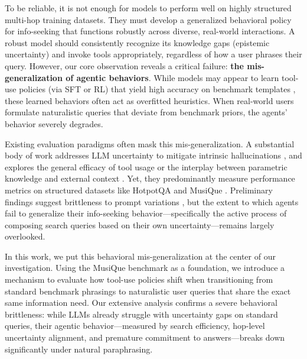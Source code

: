 \documentclass[10pt, letterpaper]{article}
\begin{document}
To be reliable, it is not enough for models to perform well on highly structured multi-hop training datasets. They must develop a generalized behavioral policy for info-seeking that functions robustly across diverse, real-world interactions. A robust model should consistently recognize its knowledge gaps (epistemic uncertainty) and invoke tools appropriately, regardless of how a user phrases their query. However, our core observation reveals a critical failure: \textbf{the mis-generalization of agentic behaviors}. While models may appear to learn tool-use policies (via SFT or RL) that yield high accuracy on benchmark templates \cite{chu_self-critique_2025}, these learned behaviors often act as overfitted heuristics. When real-world users formulate naturalistic queries that deviate from benchmark priors, the agents' behavior severely degrades.

Existing evaluation paradigms often mask this mis-generalization. A substantial body of work addresses LLM uncertainty to mitigate intrinsic hallucinations \cite{yona_can_2024, manakul_selfcheckgpt_2023, kuhn_semantic_2023, liu_metafaith_2025}, and explores the general efficacy of tool usage \cite{bai_qwen_2023, lu_toolsandbox_2025, keren_matter_2026, barres_2-bench_2025, ning_wtu-eval_2024} or the interplay between parametric knowledge and external context \cite{cheng_understanding_2024, yang_crag_2024, li_understanding_2024}. Yet, they predominantly measure performance metrics on structured datasets like HotpotQA \cite{yang_hotpotqa_2018} and MusiQue \cite{trivedi__2022}. Preliminary findings suggest brittleness to prompt variations \cite{jang_how_2026, rabinovich_robustness_2025}, but the extent to which agents fail to generalize their info-seeking behavior—specifically the active process of composing search queries based on their own uncertainty—remains largely overlooked.

In this work, we put this behavioral mis-generalization at the center of our investigation. Using the MusiQue benchmark as a foundation, we introduce a mechanism to evaluate how tool-use policies shift when transitioning from standard benchmark phrasings to naturalistic user queries that share the exact same information need. Our extensive analysis confirms a severe behavioral brittleness: while LLMs already struggle with uncertainty gaps on standard queries, their agentic behavior—measured by search efficiency, hop-level uncertainty alignment, and premature commitment to answers—breaks down significantly under natural paraphrasing.
\end{document}
